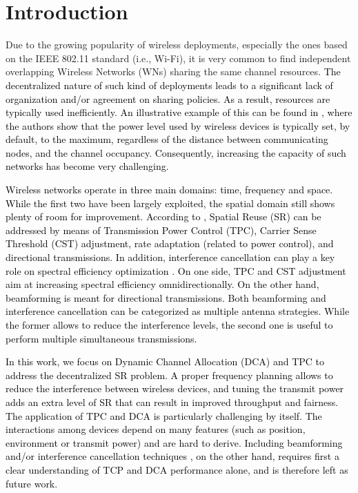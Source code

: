 \documentclass{article}
\begin{document}
	\section{Introduction}
	\label{section:introduction}
	Due to the growing popularity of wireless deployments, especially the ones based on the IEEE 802.11 standard (i.e., Wi-Fi), it is very common to find independent overlapping Wireless Networks (WNs) sharing the same channel resources. \textcolor{black}{The decentralized nature of such kind of deployments leads to a significant lack of organization and/or agreement on sharing policies. As a result, resources are typically used inefficiently. An illustrative example of this can be found in \cite{akella2007self}, where the authors show that the power level used by wireless devices is typically set, by default, to the maximum, regardless of the distance between communicating nodes, and the channel occupancy. Consequently, increasing the capacity of such networks has become very challenging.}
	
	\textcolor{black}{Wireless networks operate in three main domains: time, frequency and space. While the first two have been largely exploited, the spatial domain still shows plenty of room for improvement. According to \cite{alawieh2009improving}, Spatial Reuse (SR) can be addressed by means of Transmission Power Control (TPC), Carrier Sense Threshold (CST) adjustment, rate adaptation (related to power control), and directional transmissions. In addition, interference cancellation can play a key role on spectral efficiency optimization \cite{miridakis2013survey}. On one side, TPC and CST adjustment aim at increasing spectral efficiency omnidirectionally. On the other hand, beamforming is meant for directional transmissions. Both beamforming and interference cancellation can be categorized as multiple antenna strategies. While the former allows to reduce the interference levels, the second one is useful to perform multiple simultaneous transmissions.}
	
	\textcolor{black}{In this work, we focus on Dynamic Channel Allocation (DCA) and TPC to address the decentralized SR problem. A proper frequency planning allows to reduce the interference between wireless devices, and tuning the transmit power adds an extra level of SR that can result in improved throughput and fairness. The application of TPC and DCA is particularly challenging by itself. The interactions among devices depend on many features (such as position, environment or transmit power) and are hard to derive. %
		Including beamforming and/or interference cancellation techniques \cite{dovelos2018breaking}, on the other hand, requires first a clear understanding of TCP and DCA performance alone, and is therefore left as future work.}
	
\end{document}
